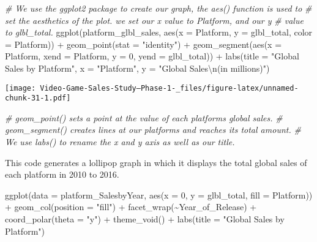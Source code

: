 \documentclass[
]{article}
\newenvironment{Shaded}{\begin{snugshade}}{\end{snugshade}}
\newcommand{\AttributeTok}[1]{\textcolor[rgb]{0.77,0.63,0.00}{#1}}
\newcommand{\CommentTok}[1]{\textcolor[rgb]{0.56,0.35,0.01}{\textit{#1}}}
\newcommand{\DecValTok}[1]{\textcolor[rgb]{0.00,0.00,0.81}{#1}}
\newcommand{\FunctionTok}[1]{\textcolor[rgb]{0.00,0.00,0.00}{#1}}
\newcommand{\NormalTok}[1]{#1}
\newcommand{\SpecialCharTok}[1]{\textcolor[rgb]{0.00,0.00,0.00}{#1}}
\newcommand{\StringTok}[1]{\textcolor[rgb]{0.31,0.60,0.02}{#1}}
\begin{document}
\begin{Shaded}
\begin{Highlighting}[]
\CommentTok{\# We use the ggplot2 package to create our graph, the aes() function is used to}
\CommentTok{\# set the aesthetics of the plot. we set our x value to Platform, and our y}
\CommentTok{\# value to glbl\_total.}
\FunctionTok{ggplot}\NormalTok{(platform\_glbl\_sales, }\FunctionTok{aes}\NormalTok{(}\AttributeTok{x =}\NormalTok{ Platform, }\AttributeTok{y =}\NormalTok{ glbl\_total, }\AttributeTok{color =}\NormalTok{ Platform)) }\SpecialCharTok{+}
    \FunctionTok{geom\_point}\NormalTok{(}\AttributeTok{stat =} \StringTok{"identity"}\NormalTok{) }\SpecialCharTok{+} \FunctionTok{geom\_segment}\NormalTok{(}\FunctionTok{aes}\NormalTok{(}\AttributeTok{x =}\NormalTok{ Platform, }\AttributeTok{xend =}\NormalTok{ Platform,}
    \AttributeTok{y =} \DecValTok{0}\NormalTok{, }\AttributeTok{yend =}\NormalTok{ glbl\_total)) }\SpecialCharTok{+} \FunctionTok{labs}\NormalTok{(}\AttributeTok{title =} \StringTok{"Global Sales by Platform"}\NormalTok{, }\AttributeTok{x =} \StringTok{"Platform"}\NormalTok{,}
    \AttributeTok{y =} \StringTok{"Global Sales}\SpecialCharTok{\textbackslash{}n}\StringTok{(in millions)"}\NormalTok{)}
\end{Highlighting}
\end{Shaded}

\texttt{[image: Video-Game-Sales-Study--Phase-1-\_files/figure-latex/unnamed-chunk-31-1.pdf]}

\begin{Shaded}
\begin{Highlighting}[]
\CommentTok{\# geom\_point() sets a point at the value of each platforms global sales.}
\CommentTok{\# geom\_segment() creates lines at our platforms and reaches its total amount.}
\CommentTok{\# We use labs() to rename the x and y axis as well as our title.}
\end{Highlighting}
\end{Shaded}

This code generates a lollipop graph in which it displays the total
global sales of each platform in 2010 to 2016.

\begin{Shaded}
\begin{Highlighting}[]
\FunctionTok{ggplot}\NormalTok{(}\AttributeTok{data =}\NormalTok{ platform\_SalesbyYear, }\FunctionTok{aes}\NormalTok{(}\AttributeTok{x =} \DecValTok{0}\NormalTok{, }\AttributeTok{y =}\NormalTok{ glbl\_total, }\AttributeTok{fill =}\NormalTok{ Platform)) }\SpecialCharTok{+}
    \FunctionTok{geom\_col}\NormalTok{(}\AttributeTok{position =} \StringTok{"fill"}\NormalTok{) }\SpecialCharTok{+} \FunctionTok{facet\_wrap}\NormalTok{(}\SpecialCharTok{\textasciitilde{}}\NormalTok{Year\_of\_Release) }\SpecialCharTok{+} \FunctionTok{coord\_polar}\NormalTok{(}\AttributeTok{theta =} \StringTok{"y"}\NormalTok{) }\SpecialCharTok{+}
    \FunctionTok{theme\_void}\NormalTok{() }\SpecialCharTok{+} \FunctionTok{labs}\NormalTok{(}\AttributeTok{title =} \StringTok{"Global Sales by Platform"}\NormalTok{)}
\end{Highlighting}
\end{Shaded}
\end{document}
